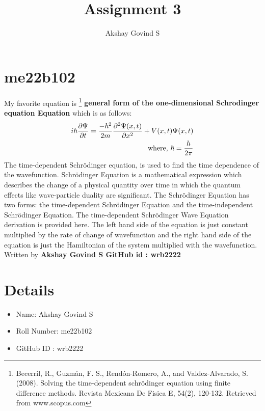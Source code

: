 \documentclass{article}
\author{Akshay Govind S}
\title{Assignment 3}
\begin{document}
\maketitle
\section*{me22b102}
My favorite equation is \footnote[1]{Becerril, R., Guzmán, F. S., Rendón-Romero, A., and Valdez-Alvarado, S. (2008). Solving the time-dependent schrödinger equation using finite difference methods. Revista Mexicana De Fisica E, 54(2), 120-132. Retrieved from www.scopus.com } \textbf{general form of the one-dimensional  Schr$\mathbf{\ddot{o}}$dinger equation  Equation} which is as follows: 
\begin{eqnarray}
    \label{Schrodinger's equation}
    i\hbar{\partial \Psi \over \partial t} = {- \hbar^2 \over 2m} {\partial^2 \Psi(x,t) \over \partial x^2} + V(x,t)\Psi(x,t)
    \\ \textrm{where, } \hbar = \frac{h}{2 \pi}    
\end{eqnarray}
The time-dependent Schrödinger equation, is used to find the time dependence of the wavefunction.
Schrödinger Equation is a mathematical expression which describes the change of a physical quantity
over time in which the quantum effects like wave-particle duality are significant. The Schrödinger
Equation has two forms: the time-dependent Schrödinger Equation and the time-independent Schrödinger
Equation. The time-dependent Schrödinger Wave Equation derivation is provided here. The left hand side 
of the equation is just constant multiplied by the rate of change of wavefunction and the right hand side 
of the equation is just the Hamiltonian of the system multiplied with the wavefunction. Written by \textbf{Akshay Govind S 
GitHub id : wrb2222}

\section*{Details}
\begin{itemize}
    \item Name: Akshay Govind S 
    \item Roll Number: me22b102
    \item GitHub ID : wrb2222
\end{itemize}
\end{document}
